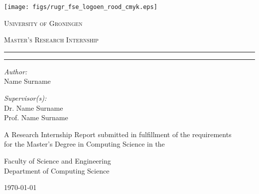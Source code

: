 \begin{titlepage}
    \centering
    \large
    
    \texttt{[image: figs/rugr\_fse\_logoen\_rood\_cmyk.eps]}
    
    \vspace{1cm}
    
    {\Large\textsc{University of Groningen}}
    
    \vspace{1cm}

    \textsc{Master's Research Internship}
    
    \vspace{1cm}

    \par\noindent\rule{\textwidth}{2pt}
    
    \vspace{0.5cm}
    
    {\Huge \textbf{\theprojecttitle}\par}
    
    \vspace{0.5cm}
    
    \par\noindent\rule{\textwidth}{2pt}
    
    \vspace{1cm}

    \noindent
    \begin{minipage}[t]{.5\textwidth}
    \raggedright
    \textit{Author:}\\
    Name Surname
    \end{minipage}%
    \begin{minipage}[t]{.5\textwidth}
    \raggedleft
    \textit{Supervisor(s):} \\
    Dr. Name Surname\\
    Prof. Name Surname
    \end{minipage}

    \vspace{1.5cm}

    A
    Research Internship
    Report submitted in fulfillment of the requirements\\
    for the Master’s Degree in Computing Science
    in the
    
    Faculty of Science and Engineering\\
    Department of Computing Science

    \vfill
    
    \today

\end{titlepage}

\newpage
